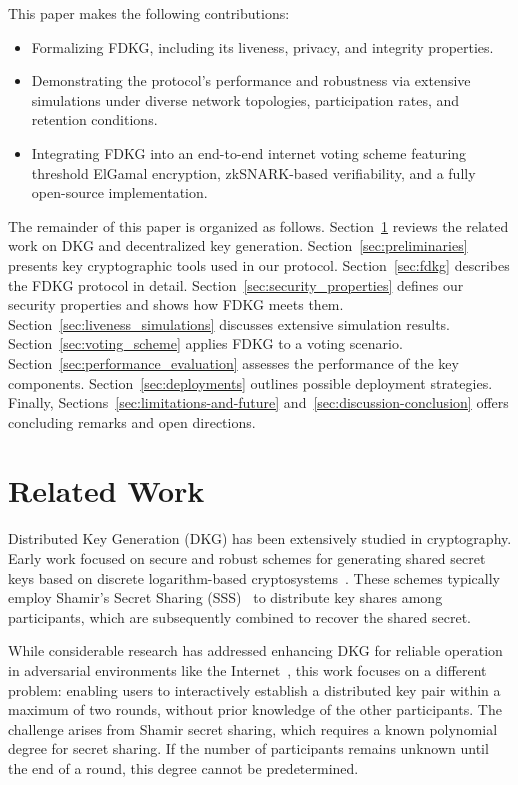 \documentclass[lettersize,journal]{IEEEtran}
\theoremstyle{definition}
\begin{document}
This paper makes the following contributions:
\begin{itemize}

    \item Formalizing FDKG, including its liveness, privacy, and integrity properties.
    \item Demonstrating the protocol’s performance and robustness via extensive simulations under diverse network topologies, participation rates, and retention conditions.
    \item Integrating FDKG into an end-to-end internet voting scheme featuring threshold ElGamal encryption, zkSNARK-based verifiability, and a fully open-source implementation.
\end{itemize}

The remainder of this paper is organized as follows.  
Section~\ref{sec:related_work} reviews the related work on DKG and decentralized key generation.  
Section~\ref{sec:preliminaries} presents key cryptographic tools used in our protocol.  
Section~\ref{sec:fdkg} describes the FDKG protocol in detail.  
Section~\ref{sec:security_properties} defines our security properties and shows how FDKG meets them.  
Section~\ref{sec:liveness_simulations} discusses extensive simulation results. 
Section~\ref{sec:voting_scheme} applies FDKG to a voting scenario.
Section~\ref{sec:performance_evaluation} assesses the performance of the key components.
Section~\ref{sec:deployments} outlines possible deployment strategies.
Finally, Sections~\ref{sec:limitations-and-future} and~\ref{sec:discussion-conclusion} offers concluding remarks and open directions.


\section{Related Work}\label{sec:related_work}

Distributed Key Generation (DKG) has been extensively studied in cryptography. Early work focused on secure and robust schemes for generating shared secret keys based on discrete logarithm-based cryptosystems~\cite{gennaroSecureDistributedKey1999}. These schemes typically employ Shamir's Secret Sharing (SSS)~\cite{shamirHowShareSecret1979} to distribute key shares among participants, which are subsequently combined to recover the shared secret.

While considerable research has addressed enhancing DKG for reliable operation in adversarial environments like the Internet~\cite{kateDistributedKeyGeneration2012,dasPracticalAsynchronousDistributed2022,dasPracticalAsynchronousHighthreshold2022,zhangPracticalAsynchronousDistributed2023}, this work focuses on a different problem: enabling users to interactively establish a distributed key pair within a maximum of two rounds, without prior knowledge of the other participants.  The challenge arises from Shamir secret sharing, which requires a known polynomial degree for secret sharing.  If the number of participants remains unknown until the end of a round, this degree cannot be predetermined.
\end{document}
